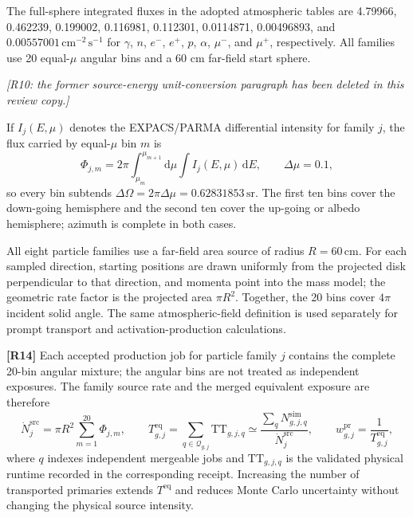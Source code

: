 \documentclass[11pt]{article}
\newcommand{\revdeleted}[1]{\par\noindent\textcolor{revisionblue}{\small\itshape [#1]}\par}
\begin{document}
The full-sphere integrated fluxes in the adopted atmospheric tables are 4.79966, 0.462239, 0.199002,
0.116981, 0.112301, 0.0114871, 0.00496893, and
$0.00557001\,\mathrm{cm^{-2}\,s^{-1}}$ for $\gamma$, $n$, $e^-$, $e^+$, $p$,
$\alpha$, $\mu^-$, and $\mu^+$, respectively. All families use 20 equal-$\mu$
angular bins and a 60 cm far-field start sphere.

\revdeleted{R10: the former source-energy unit-conversion paragraph has been deleted in this review copy.}

If $I_j(E,\mu)$ denotes the EXPACS/PARMA differential intensity for family $j$,
the flux carried by equal-$\mu$ bin $m$ is
\begin{equation}
 \Phi_{j,m}=2\pi\int_{\mu_m}^{\mu_{m+1}}\!\mathrm d\mu
             \int I_j(E,\mu)\,\mathrm dE,
 \qquad \Delta\mu=0.1,
 \label{eq:source_bin_flux}
\end{equation}
so every bin subtends $\Delta\Omega=2\pi\Delta\mu=0.62831853\,\mathrm{sr}$.
The first ten bins cover the down-going hemisphere and the second ten cover the
up-going or albedo hemisphere; azimuth is complete in both cases.

All eight particle families use a far-field area source of radius
$R=60\,\mathrm{cm}$. For each sampled direction, starting positions are drawn
uniformly from the projected disk perpendicular to that direction, and momenta
point into the mass model; the geometric rate factor is the projected area
$\pi R^2$. Together, the 20 bins cover $4\pi$ incident solid angle. The same
atmospheric-field definition is used separately for prompt transport and
activation-production calculations.

\begingroup
\color{revisionblue}
\noindent\textbf{[R14]} Each accepted production job for particle family $j$
contains the complete 20-bin angular mixture; the angular bins are not treated
as independent exposures. The family source rate and the merged equivalent
exposure are therefore
\begin{equation}
 \dot N^{\mathrm{src}}_{j}=\pi R^2\sum_{m=1}^{20}\Phi_{j,m},
 \qquad
 T^{\mathrm{eq}}_{g,j}=\sum_{q\in\mathcal Q_{g,j}}\mathrm{TT}_{g,j,q}
 \simeq
 \frac{\sum_q N^{\mathrm{sim}}_{g,j,q}}{\dot N^{\mathrm{src}}_{j}},
 \qquad
 w^{\mathrm{pr}}_{g,j}=\frac{1}{T^{\mathrm{eq}}_{g,j}},
 \label{eq:prompt_equivalent_exposure}
\end{equation}
where $q$ indexes independent mergeable jobs and $\mathrm{TT}_{g,j,q}$ is the
validated physical runtime recorded in the corresponding receipt. Increasing
the number of transported primaries extends $T^{\mathrm{eq}}$ and reduces Monte
Carlo uncertainty without changing the physical source intensity.
\end{document}
